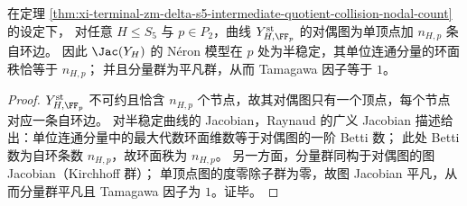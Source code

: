 \begin{corollary}\label{cor:xi-terminal-zm-delta-s5-intermediate-quotient-jacobian-torus-rank-trivial-component}
在定理 \ref{thm:xi-terminal-zm-delta-s5-intermediate-quotient-collision-nodal-count} 的设定下，
对任意 \(H\le S_5\) 与 \(p\in P_2\)，曲线 \(Y^{\mathrm{st}}_{H,\FF_p}\) 的对偶图为单顶点加 \(n_{H,p}\) 条自环边。
因此 \(\Jac(Y_H)\) 的 N\'eron 模型在 \(p\) 处为半稳定，其单位连通分量的环面秩恰等于 \(n_{H,p}\)；
并且分量群为平凡群，从而 Tamagawa 因子等于 \(1\)。
\end{corollary}
\begin{proof}
\(Y^{\mathrm{st}}_{H,\FF_p}\) 不可约且恰含 \(n_{H,p}\) 个节点，故其对偶图只有一个顶点，每个节点对应一条自环边。
对半稳定曲线的 Jacobian，Raynaud 的广义 Jacobian 描述给出：单位连通分量中的最大代数环面维数等于对偶图的一阶 Betti 数；
此处 Betti 数为自环条数 \(n_{H,p}\)，故环面秩为 \(n_{H,p}\)。
另一方面，分量群同构于对偶图的图 Jacobian（Kirchhoff 群）；
单顶点图的度零除子群为零，故图 Jacobian 平凡，从而分量群平凡且 Tamagawa 因子为 \(1\)。证毕。
\end{proof}

\endinput

